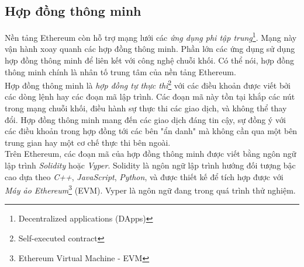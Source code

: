 \subsection{Hợp đồng thông minh}

Nền tảng Ethereum còn hỗ trợ mạng lưới các \textit{ứng dụng phi tập trung}\footnote{Decentralized applications (DApps)}. Mạng này vận hành xoay quanh các hợp đồng thông minh. Phần lớn các ứng dụng sử dụng hợp đồng thông minh để liên kết với công nghệ chuỗi khối. Có thể nói, hợp đồng thông minh chính là nhân tố trung tâm của nền tảng Ethereum.\\

Hợp đồng thông minh là \textit{hợp đồng tự thực thi}\footnote{Self-executed contract} với các điều khoản được viết bởi các dòng lệnh hay các đoạn mã lập trình. Các đoạn mã này tồn tại khắp các nút trong mạng chuỗi khối, điều hành sự thực thi các giao dịch, và không thể thay đổi. Hợp đồng thông minh mang đến các giao dịch đáng tin cậy, sự đồng ý với các điều khoản trong hợp đồng tới các bên "ẩn danh" mà không cần qua một bên trung gian hay một cơ chế thực thi bên ngoài.\\

Trên Ethereum, các đoạn mã của hợp đồng thông minh được viết bằng ngôn ngữ lập trình \textit{Solidity} hoặc \textit{Vyper}. Solidity là ngôn ngữ lập trình hướng đối tượng bậc cao dựa theo \textit{C++}, \textit{JavaScript}, \textit{Python}, và được thiết kế để tích hợp được với \textit{Máy ảo Ethereum}\footnote{Ethereum Virtual Machine - EVM} (EVM). Vyper là ngôn ngữ đang trong quá trình thử nghiệm.\\